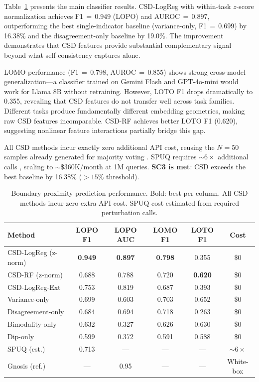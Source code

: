 \documentclass[11pt,letterpaper]{article}
\begin{document}
Table~\ref{tab:main} presents the main classifier results. CSD-LogReg with within-task $z$-score normalization achieves F1$\,{=}\,$0.949 (LOPO) and AUROC$\,{=}\,$0.897, outperforming the best single-indicator baseline (variance-only, F1$\,{=}\,$0.699) by 16.38\% and the disagreement-only baseline by 19.0\%. The improvement demonstrates that CSD features provide substantial complementary signal beyond what self-consistency captures alone.

LOMO performance (F1$\,{=}\,$0.798, AUROC$\,{=}\,$0.855) shows strong cross-model generalization---a classifier trained on Gemini Flash and GPT-4o-mini would work for Llama 8B without retraining. However, LOTO F1 drops dramatically to 0.355, revealing that CSD features do not transfer well across task families. Different tasks produce fundamentally different embedding geometries, making raw CSD features incomparable. CSD-RF achieves better LOTO F1 (0.620), suggesting nonlinear feature interactions partially bridge this gap.

All CSD methods incur exactly zero additional API cost, reusing the $N{=}50$ samples already generated for majority voting \cite{wang2023selfconsistency}. SPUQ requires ${\sim}6{\times}$ additional calls \cite{gao2024spuq}, scaling to ${\sim}$\$360K/month at 1M queries. \textbf{SC3 is met}: CSD exceeds the best baseline by 16.38\% ($> 15\%$ threshold).

\begin{table}[t]
\centering
\caption{Boundary proximity prediction performance. Bold: best per column. All CSD methods incur zero extra API cost. SPUQ cost estimated from required perturbation calls.}
\label{tab:main}
\small
\begin{tabular}{lccccc}
\toprule
Method & LOPO F1 & LOPO AUC & LOMO F1 & LOTO F1 & Cost \\
\midrule
CSD-LogReg (z-norm) & \textbf{0.949} & \textbf{0.897} & \textbf{0.798} & 0.355 & \$0 \\
CSD-RF (z-norm) & 0.688 & 0.788 & 0.720 & \textbf{0.620} & \$0 \\
CSD-LogReg-Ext & 0.753 & 0.819 & 0.687 & 0.393 & \$0 \\
Variance-only & 0.699 & 0.603 & 0.703 & 0.652 & \$0 \\
Disagreement-only & 0.684 & 0.694 & 0.718 & 0.263 & \$0 \\
Bimodality-only & 0.632 & 0.327 & 0.626 & 0.630 & \$0 \\
Dip-only & 0.599 & 0.372 & 0.591 & 0.588 & \$0 \\
SPUQ (est.) & 0.713 & --- & --- & --- & ${\sim}6{\times}$ \\
Gnosis (ref.) & --- & 0.95 & --- & --- & White-box \\
\bottomrule
\end{tabular}
\end{table}
\end{document}
